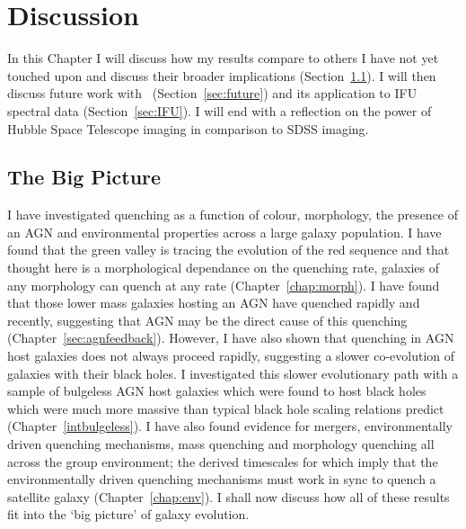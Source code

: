 \chapter{Discussion}

In this Chapter I will discuss how my results compare to others I have not yet touched upon and discuss their broader implications (Section~\ref{sec:bigpic}). I will then discuss future work with \starpy\ (Section~\ref{sec:future}) and its application to IFU spectral data (Section~\ref{sec:IFU}). I will end with a reflection on the power of Hubble Space Telescope imaging in comparison to SDSS imaging. 


\section{The Big Picture}\label{sec:bigpic}

I have investigated quenching as a function of colour, morphology, the presence of an AGN and environmental properties across a large galaxy population. I have found that the green valley is tracing the evolution of the red sequence and that thought here is a morphological dependance on the quenching rate, galaxies of any morphology can quench at any rate (Chapter~\ref{chap:morph}). I have found that those lower mass galaxies hosting an AGN have quenched rapidly and recently, suggesting that AGN may be the direct cause of this quenching (Chapter~\ref{sec:agnfeedback}). However, I have also shown that quenching in AGN host galaxies does not always proceed rapidly, suggesting a slower co-evolution of galaxies with their black holes. I investigated this slower evolutionary path with a sample of bulgeless AGN host galaxies which were found to host black holes which were much more massive than typical black hole scaling relations predict (Chapter~\ref{intbulgeless}). I have also found evidence for mergers, environmentally driven quenching mechanisms, mass quenching and morphology quenching all across the group environment; the derived timescales for which imply that the environmentally driven quenching mechanisms must work in sync to quench a satellite galaxy (Chapter~\ref{chap:env}). I shall now discuss how all of these results fit into the `big picture' of galaxy evolution. 

